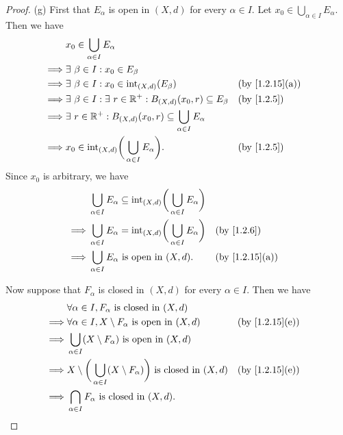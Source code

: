 \begin{proof}{(g)}
  First that \(E_\alpha\) is open in \((X, d)\) for every \(\alpha \in I\).
  Let \(x_0 \in \bigcup_{\alpha \in I} E_\alpha\).
  Then we have
  \begin{align*}
             & x_0 \in \bigcup_{\alpha \in I} E_\alpha                                                                              \\
    \implies & \exists\ \beta \in I : x_0 \in E_\beta                                                                               \\
    \implies & \exists\ \beta \in I : x_0 \in \text{int}_{(X, d)}(E_\beta)                        &  & \text{(by \cref{1.2.15}(a))} \\
    \implies & \exists\ \beta \in I : \exists\ r \in \R^+ : B_{(X, d)}(x_0, r) \subseteq E_\beta  &  & \text{(by \cref{1.2.5})}     \\
    \implies & \exists\ r \in \R^+ : B_{(X, d)}(x_0, r) \subseteq \bigcup_{\alpha \in I} E_\alpha                                   \\
    \implies & x_0 \in \text{int}_{(X, d)}\bigg(\bigcup_{\alpha \in I} E_\alpha\bigg).            &  & \text{(by \cref{1.2.5})}
  \end{align*}
  Since \(x_0\) is arbitrary, we have
  \begin{align*}
             & \bigcup_{\alpha \in I} E_\alpha \subseteq \text{int}_{(X, d)}\bigg(\bigcup_{\alpha \in I} E_\alpha\bigg)                                   \\
    \implies & \bigcup_{\alpha \in I} E_\alpha = \text{int}_{(X, d)}\bigg(\bigcup_{\alpha \in I} E_\alpha\bigg)         &  & \text{(by \cref{1.2.6})}     \\
    \implies & \bigcup_{\alpha \in I} E_\alpha \text{ is open in } (X, d).                                              &  & \text{(by \cref{1.2.15}(a))}
  \end{align*}

  Now suppose that \(F_\alpha\) is closed in \((X, d)\) for every \(\alpha \in I\).
  Then we have
  \begin{align*}
             & \forall \alpha \in I, F_\alpha \text{ is closed in } (X, d)                                                                          \\
    \implies & \forall \alpha \in I, X \setminus F_\alpha \text{ is open in } (X, d)                              &  & \text{(by \cref{1.2.15}(e))} \\
    \implies & \bigcup_{\alpha \in I} (X \setminus F_\alpha) \text{ is open in } (X, d)                                                             \\
    \implies & X \setminus \bigg(\bigcup_{\alpha \in I} (X \setminus F_\alpha)\bigg) \text{ is closed in } (X, d) &  & \text{(by \cref{1.2.15}(e))} \\
    \implies & \bigcap_{\alpha \in I} F_\alpha \text{ is closed in } (X, d).
  \end{align*}
\end{proof}

